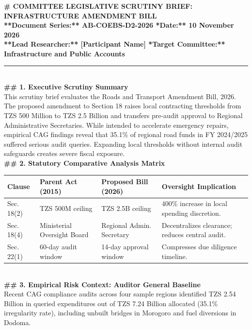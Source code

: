\documentclass[11pt, a4paper]{report}
\begin{document}
\begin{tcolorbox}[colback=lightgrey, colframe=bordergrey, title=\textbf{Deliverable 2 Preview: \texttt{Day2\_Legislative\_Scrutiny\_Brief.md}}]
\small
\textbf{\# COMMITTEE LEGISLATIVE SCRUTINY BRIEF: INFRASTRUCTURE AMENDMENT BILL}\\
\textbf{**Document Series:** AB-COEBS-D2-2026 \quad \textbar{} \quad **Date:** 10 November 2026}\\
\textbf{**Lead Researcher:** [Participant Name] \quad \textbar{} \quad **Target Committee:** Infrastructure and Public Accounts}\\[0.2cm]
\rule{\textwidth}{0.4pt}\\[0.2cm]
\textbf{\#\# 1. Executive Scrutiny Summary}\\
This scrutiny brief evaluates the Roads and Transport Amendment Bill, 2026. The proposed amendment to Section 18 raises local contracting thresholds from TZS 500 Million to TZS 2.5 Billion and transfers pre-audit approval to Regional Administrative Secretaries. While intended to accelerate emergency repairs, empirical CAG findings reveal that 35.1\% of regional road funds in FY 2024/2025 suffered serious audit queries. Expanding local thresholds without internal audit safeguards creates severe fiscal exposure.\\[0.2cm]
\textbf{\#\# 2. Statutory Comparative Analysis Matrix}\\
\begin{tabular}{p{2.2cm}p{3.2cm}p{3.2cm}p{3.8cm}}
\toprule
\textbf{Clause} & \textbf{Parent Act (2015)} & \textbf{Proposed Bill (2026)} & \textbf{Oversight Implication} \\
\midrule
Sec. 18(2) & TZS 500M ceiling & TZS 2.5B ceiling & 400\% increase in local spending discretion. \\
Sec. 18(4) & Ministerial Oversight Board & Regional Admin. Secretary & Decentralizes clearance; reduces central audit. \\
Sec. 22(1) & 60-day audit window & 14-day approval window & Compresses due diligence timeline. \\
\bottomrule
\end{tabular}\\[0.2cm]
\textbf{\#\# 3. Empirical Risk Context: Auditor General Baseline}\\
Recent CAG compliance audits across four sample regions identified TZS 2.54 Billion in queried expenditures out of TZS 7.24 Billion allocated (35.1\% irregularity rate), including unbuilt bridges in Morogoro and fuel diversions in Dodoma.\\[0.2cm]

\end{tcolorbox}
\end{document}
